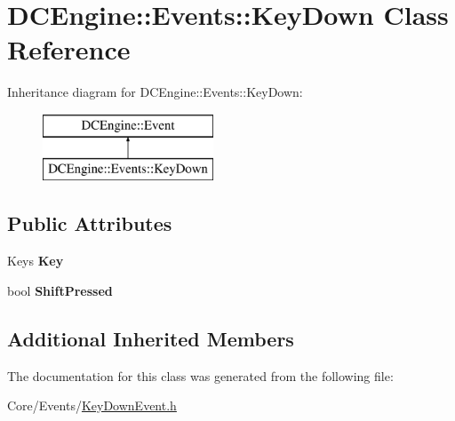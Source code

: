 \hypertarget{classDCEngine_1_1Events_1_1KeyDown}{\section{D\-C\-Engine\-:\-:Events\-:\-:Key\-Down Class Reference}
\label{classDCEngine_1_1Events_1_1KeyDown}
}
Inheritance diagram for D\-C\-Engine\-:\-:Events\-:\-:Key\-Down\-:\begin{figure}[H]
\begin{center}
\leavevmode
\includegraphics[height=2.000000cm]{classDCEngine_1_1Events_1_1KeyDown}
\end{center}
\end{figure}
\subsection*{Public Attributes}
\begin{DoxyCompactItemize}
\item 
\hypertarget{classDCEngine_1_1Events_1_1KeyDown_a893d3c2d65a2c0c3fa8a8215a31a3363}{Keys {\bfseries Key}}\label{classDCEngine_1_1Events_1_1KeyDown_a893d3c2d65a2c0c3fa8a8215a31a3363}

\item 
\hypertarget{classDCEngine_1_1Events_1_1KeyDown_ad2ba3a3c253a456009c77d66a4c84655}{bool {\bfseries Shift\-Pressed}}\label{classDCEngine_1_1Events_1_1KeyDown_ad2ba3a3c253a456009c77d66a4c84655}

\end{DoxyCompactItemize}
\subsection*{Additional Inherited Members}


The documentation for this class was generated from the following file\-:\begin{DoxyCompactItemize}
\item 
Core/\-Events/\hyperlink{KeyDownEvent_8h}{Key\-Down\-Event.\-h}\end{DoxyCompactItemize}
